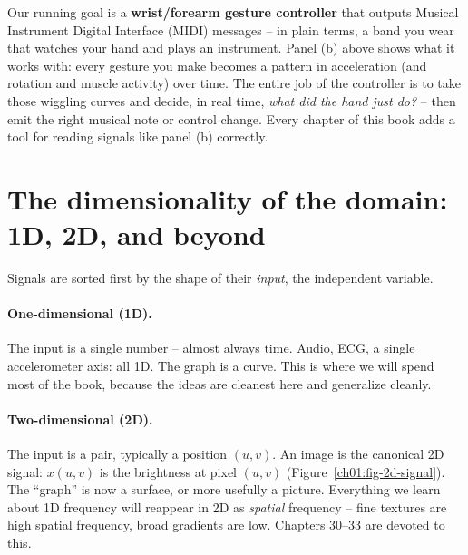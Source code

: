 \begin{goalbox}
Our running goal is a \textbf{wrist/forearm gesture controller} that outputs Musical Instrument Digital Interface (MIDI) messages -- in plain
terms, a band you wear that watches your hand and plays an instrument. Panel (b) above shows
what it works with: every gesture you make becomes a pattern in acceleration (and rotation
and muscle activity) over time. The entire job of the controller is to take those wiggling
curves and decide, in real time, \emph{what did the hand just do?} -- then emit the right
musical note or control change. Every chapter of this book adds a tool for reading signals like panel (b)
correctly.
\end{goalbox}

\section{The dimensionality of the domain: 1D, 2D, and beyond}
\label{ch01:dimension}

Signals are sorted first by the shape of their \emph{input}, the independent variable.

\paragraph{One-dimensional (1D).} The input is a single number -- almost always time. Audio,
ECG, a single accelerometer axis: all 1D. The graph is a curve. This is where we will spend most
of the book, because the ideas are cleanest here and generalize cleanly.

\paragraph{Two-dimensional (2D).} The input is a pair, typically a position $(u,v)$. An image is
the canonical 2D signal: $x(u,v)$ is the brightness at pixel $(u,v)$ (Figure~\ref{ch01:fig-2d-signal}). The ``graph'' is now a
surface, or more usefully a picture. Everything we learn about 1D frequency will reappear in 2D
as \emph{spatial} frequency -- fine textures are high spatial frequency, broad gradients are low.
Chapters 30--33 are devoted to this.

